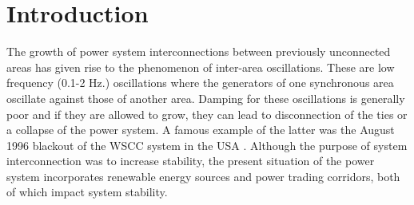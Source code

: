\documentclass[conference]{IEEEtran}
\begin{document}
\begin{abstract}
\end{abstract}





%
\IEEEpeerreviewmaketitle

\section{Introduction}
The growth of power system interconnections between previously unconnected areas has given rise to the phenomenon of inter-area oscillations. These are low frequency (0.1-2 Hz.) oscillations where the generators of one synchronous area oscillate against those of another area. Damping for these oscillations is generally poor and if they are allowed to grow, they can lead to disconnection of the ties or a collapse of the power system. A famous example of the latter was the August 1996 blackout of the WSCC system in the USA \cite{NAERC}. Although the purpose of system interconnection was to increase stability, the present situation of the power system incorporates renewable energy sources and power trading corridors, both of which impact system stability.
\end{document}
